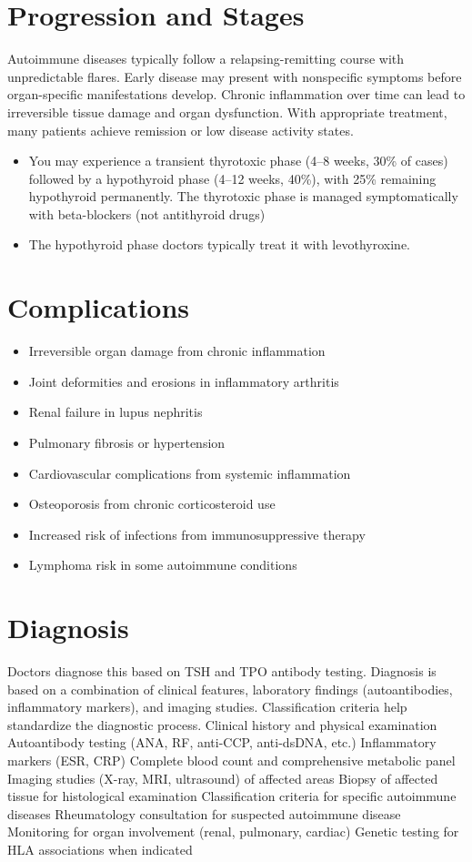 \section{Progression and Stages}
Autoimmune diseases typically follow a relapsing-remitting course with unpredictable flares. Early disease may present with nonspecific symptoms before organ-specific manifestations develop. Chronic inflammation over time can lead to irreversible tissue damage and organ dysfunction. With appropriate treatment, many patients achieve remission or low disease activity states.

\begin{itemize}[noitemsep]
  \item You may experience a transient thyrotoxic phase (4--8 weeks, 30\% of cases) followed by a hypothyroid phase (4--12 weeks, 40\%), with 25\% remaining hypothyroid permanently. The thyrotoxic phase is managed symptomatically with beta-blockers (not antithyroid drugs)
  \item The hypothyroid phase doctors typically treat it with levothyroxine.
\end{itemize}
\section{Complications}
\begin{itemize}[noitemsep]
  \item Irreversible organ damage from chronic inflammation
  \item Joint deformities and erosions in inflammatory arthritis
  \item Renal failure in lupus nephritis
  \item Pulmonary fibrosis or hypertension
  \item Cardiovascular complications from systemic inflammation
  \item Osteoporosis from chronic corticosteroid use
  \item Increased risk of infections from immunosuppressive therapy
  \item Lymphoma risk in some autoimmune conditions
\end{itemize}
\section{Diagnosis}
Doctors diagnose this based on TSH and TPO antibody testing. Diagnosis is based on a combination of clinical features, laboratory findings (autoantibodies, inflammatory markers), and imaging studies. Classification criteria help standardize the diagnostic process. Clinical history and physical examination Autoantibody testing (ANA, RF, anti-CCP, anti-dsDNA, etc.) Inflammatory markers (ESR, CRP) Complete blood count and comprehensive metabolic panel Imaging studies (X-ray, MRI, ultrasound) of affected areas Biopsy of affected tissue for histological examination Classification criteria for specific autoimmune diseases Rheumatology consultation for suspected autoimmune disease Monitoring for organ involvement (renal, pulmonary, cardiac) Genetic testing for HLA associations when indicated

